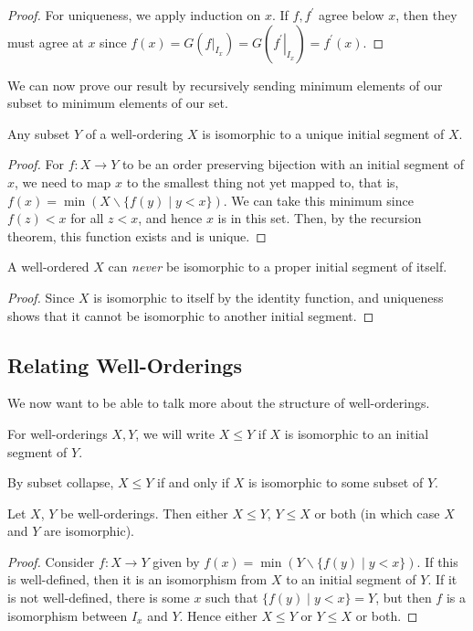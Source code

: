 \documentclass[a3paper, 10pt]{article}
\begin{document}
\begin{multicols*}{5}
\begin{proof}
For uniqueness, we apply induction on $x$. If $f, f^{\prime}$ agree below $x$, then they must agree at $x$ since $f(x)=G\left(\left.f\right|_{I_x}\right)=G\left(\left.f^{\prime}\right|_{I_x}\right)=f^{\prime}(x)$.
\end{proof}

We can now prove our result by recursively sending minimum elements of our subset to minimum elements of our set.

\begin{proposition}
  Any subset $Y$ of a well-ordering $X$ is isomorphic to a unique initial segment of $X$.
\end{proposition}
\begin{proof}
For $f: X \rightarrow Y$ to be an order preserving bijection with an initial segment of $x$, we need to map $x$ to the smallest thing not yet mapped to, that is, $f(x) = \min(X \backslash \{f(y) \mid y < x\})$. 
We can take this minimum since $f(z)<x$ for all $z < x$, and hence $x$ is in this set. Then, by the recursion theorem, this function exists and is unique.
\end{proof}

\begin{corollary}
  A well-ordered $X$ can \emph{never} be isomorphic to a proper initial segment of itself.
\end{corollary}
\begin{proof}
  Since $X$ is isomorphic to itself by the identity function, and uniqueness shows that it cannot be isomorphic to another initial segment.
\end{proof}

\subsection{Relating Well-Orderings}

We now want to be able to talk more about the structure of well-orderings.

\begin{definition}
  For well-orderings $X, Y$, we will write $X \leq Y$ if $X$ is isomorphic to an initial segment of $Y$.
\end{definition}

By subset collapse, $X \leq Y$ if and only if $X$ is isomorphic to some subset of $Y$.

\begin{proposition}[Trichotomy]
  Let $X$, $Y$ be well-orderings. Then either $X \leq Y$, $Y \leq X$ or both (in which case $X$ and $Y$ are isomorphic). 
\end{proposition}
\begin{proof}
  Consider $f: X \rightarrow Y$ given by $f(x) = \min (Y \backslash \{f(y) \mid y < x\})$. If this is well-defined, then it is an isomorphism from $X$ to an initial segment of $Y$. If it is not well-defined, there is some $x$ such that $\{f(y) \mid y < x\} = Y$, but then $f$ is a isomorphism between $I_x$ and $Y$. Hence either $X \leq Y$ or $Y \leq X$ or both. 


\end{proof}
\end{multicols*}
\end{document}
